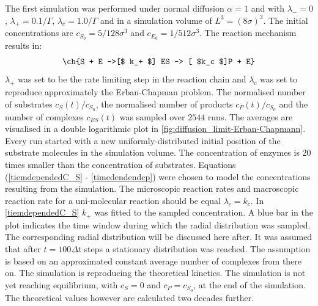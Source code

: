 \documentclass[
  a4paper,BCOR10mm,twoside,
  headsepline,footsepline,%
  fleqn,openbib
]{scrbook}
\begin{document}
\begin{figure}

  \label{fig:diffusion_limit-Erban-Chapmann_k1}
\end{figure}
The first simulation was performed under normal diffusion $\alpha=1$ and with $\lambda_-=0 $, $\lambda_+=0.1 /\Gamma$, $\lambda_c=1.0 /\Gamma$ and in a simulation volume of $L^3=(8 \sigma)^3$. The initial concentrations are $c_{S_0}=5/128\sigma^3$ and $c_{E_0}=1/512 \sigma^3$. The reaction mechanism results in:
\begin{align} \label{eq:michaelismechanismneu}
\ch{S + E ->[$ k_+ $] ES -> [ $k_c $]P + E}
\end{align}
$\lambda_+$ was set to be the rate limiting step in the reaction chain and $\lambda_c$ was set to reproduce approximately the Erban-Chapman problem.
The normalised number of substrates $c_{S}(t)/c_{S_0}$, the normalised number of products $c_{P}(t)/c_{S_0}$ and the number of complexes $c_{ES}(t)$ was sampled over $2544$ runs. The averages are visualised in a double logarithmic plot in \cref{fig:diffusion_limit-Erban-Chapmann}. Every run started with a new uniformly-distributed initial position of the substrate molecules in the simulation volume. The concentration of enzymes is 20 times smaller than the concentration of substrates. Equations (\ref{tiemdependedC_S} - \ref{timedendendcp})  were chosen to model the concentrations resulting from the simulation. The microscopic reaction rates and macroscopic reaction rate for a uni-molecular reaction should be equal $\lambda_c=k_c$. In \cref{tiemdependedC_S} $k_+$ was fitted to the sampled concentration. A blue bar in the plot indicates the time window during which the radial distribution was sampled. The corresponding radial distribution will be discussed here after. It was assumed that after $t=100 \Delta t$ steps a stationary distribution was reached. The assumption is based on an approximated constant average number of complexes from there on. The simulation is reproducing the theoretical kinetics. The simulation is not yet reaching equilibrium, with $c_S=0$ and $c_P=c_{S_0}$, at the end of the simulation. The theoretical values however are calculated two decades further. \par
\end{document}
